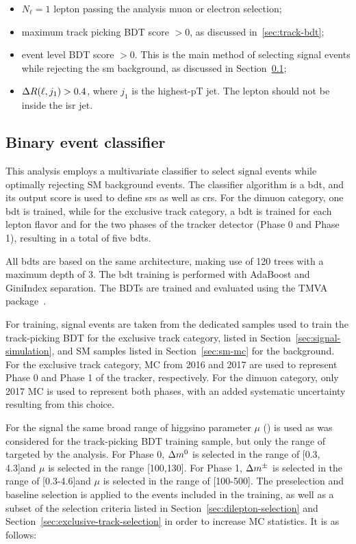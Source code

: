 \begin{itemize}

\item $N_\ell = 1$ lepton passing the analysis muon or electron selection;
\item maximum track picking BDT score $ > 0$, as discussed in~\ref{sec:track-bdt};
\item event level BDT score $ > 0$. This is the main method of selecting signal events while rejecting the \gls{sm} background, as discussed in Section~\ref{sec:event-bdt};
\item $\Delta R(\ell,j_1) > 0.4$, where $j_1$ is the highest-pT jet. The lepton should not be inside the \gls{isr} jet.
\end{itemize}

\subsection{Binary event classifier}
\label{sec:event-bdt}

This analysis employs a multivariate classifier to select signal events while optimally rejecting SM background events. The classifier algorithm is a \gls{bdt}, and its output score is used to define \glspl{sr} as well as \glspl{cr}. For the dimuon category, one \gls{bdt} is trained, while for the exclusive track category, a \gls{bdt} is trained for each lepton flavor and for the two phases of the tracker detector (Phase 0 and Phase 1), resulting in a total of five \glspl{bdt}.

All \glspl{bdt} are based on the same architecture, making use of 120 trees with a maximum depth of 3. The \gls{bdt} training is performed with AdaBoost and GiniIndex separation. The BDTs are trained and evaluated using the TMVA package~\cite{tmva}. 

For training, signal events are taken from the dedicated samples used to train the track-picking BDT for the exclusive track category, listed in Section~\ref{sec:signal-simulation}, and SM samples listed in Section~\ref{sec:sm-mc} for the background. For the exclusive track category, MC from 2016 and 2017 are used to represent Phase 0 and Phase 1 of the tracker, respectively. For the dimuon category, only 2017 MC is used to represent both phases, with an added systematic uncertainty resulting from this choice.

For the signal the same broad range of higgsino parameter $\mu$ (\PSGcpmDo) is used as was considered for the track-picking BDT training sample, but only the range of \dm targeted by the analysis. For Phase 0, $\Delta m^0$ is selected in the range of [0.3, 4.3]\GeV and $\mu$ is selected in the range [100,130]\GeV. For Phase 1, $\Delta m^\pm$ is selected in the range of [0.3-4.6]\GeV and $\mu$ is selected in the range of [100-500]\GeV. The preselection and baseline selection is applied to the events included in the training, as well as a subset of the selection criteria listed in Section~\ref{sec:dilepton-selection} and Section~\ref{sec:exclusive-track-selection} in order to increase MC statistics. It is as follows:

